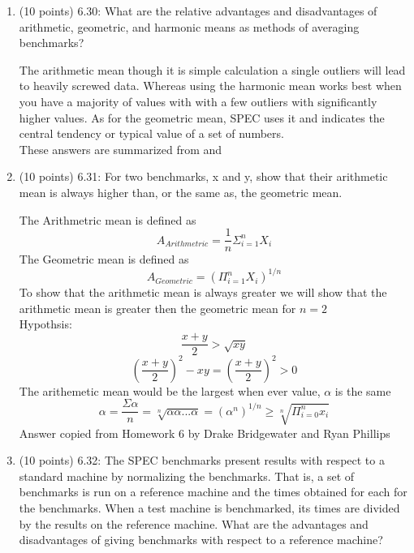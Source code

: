 \documentclass[letterpaper,10pt,onecolumn,titlepage]{article}
\begin{document}
\begin{enumerate}
\item (10 points) 6.30: What are the relative advantages and disadvantages of arithmetic, geometric, and harmonic means as methods of averaging benchmarks?\\
\begin{mdframed}[style=MyFrame]
The arithmetic mean though it is simple calculation a single outliers will lead to heavily screwed data. Whereas using the harmonic mean works best when you have a majority of values with with a few outliers with significantly higher values. As for the geometric mean, SPEC uses it and indicates the central tendency or typical value of a set of numbers. \\
These answers are summarized from \cite[The Economist at Large]{MeansDiff} and \cite[Wikipedia]{MeansWiki}
\end{mdframed}
\newpage
\item (10 points) 6.31: For two benchmarks, x and y, show that their arithmetic mean is always higher than, or the same as, the geometric mean.
\begin{mdframed}[style=MyFrame]
The Arithmetric mean is defined as 
\begin{equation}
A_{Arithmetric}=\frac{1}{n}\Sigma_{i=1}^nX_i
\end{equation}
The Geometric mean is defined as 
\begin{equation} 
A_{Geometric}=(\Pi_{i=1}^nX_i)^{1/n}
\end{equation}
To show that the arithmetic mean is always greater we will show that the arithmetic mean is greater then the geometric mean for $n=2$\\
Hypothsis:\begin{equation}
\frac{x+y}{2}>\sqrt{xy}
\end{equation}
\begin{equation}
(\frac{x+y}{2})^2-xy = (\frac{x+y}{2})^2 > 0
\end{equation}
The arithemetic mean would be the largest when ever value, $\alpha$ is the same
\begin{equation}
\alpha=\frac{\Sigma \alpha}{n}=\sqrt[n]{\alpha \alpha...\alpha}=(\alpha^n)^{1/n} \geq \sqrt[n]{\Pi_{i=0}^n x_i}
\end{equation}
Answer copied from Homework 6 by Drake Bridgewater and Ryan Phillips \cite{HW6}
\end{mdframed}
\item (10 points) 6.32: The SPEC benchmarks present results with respect to a standard machine by normalizing the benchmarks. That is, a set of benchmarks is run on a reference machine and the times obtained for each for the benchmarks. When a test machine is benchmarked, its times are divided by the results on the reference machine. What are the advantages and disadvantages of giving benchmarks with respect to a reference machine?

\end{enumerate}
\end{document}
